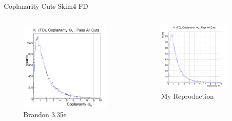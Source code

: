 \documentclass[aspectratio=169]{beamer}
\begin{document}
\begin{frame}{Coplanarity Cuts \hfill Skim4 FD}
\vspace*{-0.6cm}
    \begin{columns}
    \begin{figure}
        \centering
        \includegraphics[width=0.94\textwidth]{brandon_figs/35e.png}
        \caption{Brandon 3.35e}
    \end{figure}
    \begin{figure}
        \centering
        \includegraphics[width=0.97\textwidth]{pdfs/35e.png}
        \caption{My Reproduction}
    \end{figure}
    \end{columns}
\end{frame}
\end{document}
